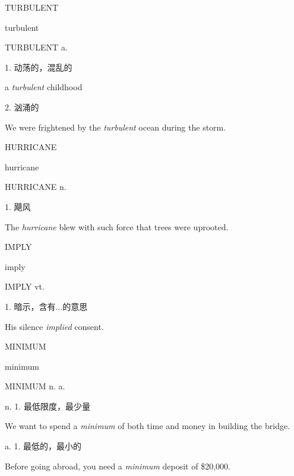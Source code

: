 \begin{flashcard}{
TURBULENT

turbulent
}
\begin{center}
TURBULENT a. 
\end{center}
1. 动荡的，混乱的

a \textit{turbulent} childhood

2. 汹涌的

We were frightened by the \textit{turbulent} ocean during the storm.

\end{flashcard}
\begin{flashcard}{
HURRICANE

hurricane
}
\begin{center}
HURRICANE n. 
\end{center}
1. 飓风

The \textit{hurricane} blew with such force that trees were uprooted.

\end{flashcard}
\begin{flashcard}{
IMPLY

imply
}
\begin{center}
IMPLY vt. 
\end{center}
1. 暗示，含有...的意思

His silence \textit{implied} consent.

\end{flashcard}
\begin{flashcard}{
MINIMUM

minimum
}
\begin{center}
MINIMUM n. a. 
\end{center}
n. 1. 最低限度，最少量

We want to spend a \textit{minimum} of both time and money in building the bridge.

a. 1. 最低的，最小的

Before going abroad, you need a \textit{minimum} deposit of \$20,000.

\end{flashcard}
